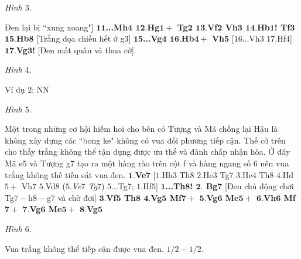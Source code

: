 \begin{multicols}{2}
	\begin{center}
		\newgame
		\showboard
		\vskip 0.1cm
		\textit{\small\color{gocco}Hình $3$.}
	\end{center}
	Đen lại bị ``xung xoang"]
	\vskip 0.1cm
	$\pmb{11}$\textbf{\color{gocco}...Mh$\pmb{4}$ $\pmb{12.}$Hg$\pmb{1+}$ Tg$\pmb{2}$ $\pmb{13.}$Vf$\pmb{2}$ Vh$\pmb{3}$ $\pmb{14.}$Hb$\pmb{1}$! Tf$\pmb{3}$ $\pmb{15.}$Hb$\pmb{8}$} [Trắng dọa chiếu hết ở g$3$]
	\vskip 0.1cm
	$\pmb{15}$\textbf{\color{gocco}...Vg$\pmb{4}$ $\pmb{16.}$Hb$\pmb{4+}$ Vh}$\pmb{5}$ [$16$...Vh$3$ $17.$Hf$4$]
	\vskip 0.1cm
	$\pmb{17.}$\textbf{\color{gocco}Vg$\pmb{3}$!} [Đen mất quân và thua cờ]
	\begin{center}
		\newgame
		\showboard
		\vskip 0.1cm
		\textit{\small\color{gocco}Hình $4$.}
	\end{center}
	Ví dụ $2$: NN
	\begin{center}
		\newgame
		\showboard
		\vskip 0.1cm
		\textit{\small\color{gocco}Hình $5$.}
	\end{center}
	Một trong những cơ hội hiếm hoi cho bên có Tượng và Mã chống lại Hậu là không xây dựng các ``bong ke" không có vua đối phương tiếp cận. Thế cờ trên cho thấy trắng không thể tận dụng được ưu thế và đành chấp nhận hòa. Ở đây Mã e$5$ và Tượng g$7$ tạo ra một hàng rào trên cột f và hàng ngang số $6$ nên vua trắng không thế tiến sát vua đen.
	\vskip 0.1cm
	$\pmb{1.}$\textbf{\color{gocco}Ve}$\pmb{7}$ [$1.$Hh$3$ Th$8$ $2.$He$3$ Tg$7$ $3.$He$4$ Th$8$ $4.$Hd$5+$ Vh$7$ $5.$Vd$8$ ($5.$\textit{Ve$7$ Tg}$7$) $5$...Tg$7$; $1.$Hf$5$]
	\vskip 0.1cm
	$\pmb{1}$\textbf{\color{gocco}...Th$\pmb{8}$! $\pmb{2.}$ Bg}$\pmb{7}$ [Đen chủ động chơi Tg$7-$h$8-$g$7$ và chờ đợi]
	\vskip 0.1cm
	$\pmb{3.}$\textbf{\color{gocco}Vf$\pmb{5}$ Th$\pmb{8}$ $\pmb{4.}$Vg$\pmb{5}$ Mf$\pmb{7+}$ $\pmb{5.}$Vg$\pmb{6}$ Me$\pmb{5+}$ $\pmb{6.}$Vh$\pmb{6}$ Mf$\pmb{7+}$ $\pmb{7.}$Vg$\pmb{6}$ Me$\pmb{5+}$ $\pmb{8.}$Vg$\pmb{5}$}
	\begin{center}
		\newgame
		\showboard
		\vskip 0.1cm
		\textit{\small\color{gocco}Hình $6$.}
	\end{center}
	Vua trắng không thể tiếp cận được vua đen.
	\vskip 0.1cm
	$1/2 - 1/2$.
\end{multicols}




